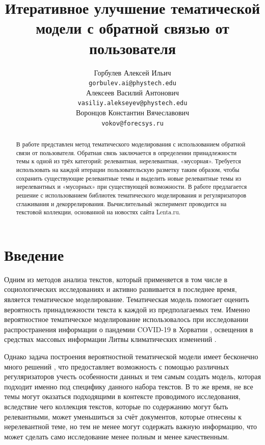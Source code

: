 \documentclass{article}
\title{Итеративное улучшение тематической модели с обратной связью от пользователя}
\author{ Горбулев Алексей Ильич \\
	\texttt{gorbulev.ai@phystech.edu} \\
	\And
	Алексеев Василий Антонович \\
	\texttt{vasiliy.alekseyev@phystech.edu} \\
	\And
    Воронцов Константин Вячеславович \\
    \texttt{vokov@forecsys.ru} \\
}
\date{}
\begin{document}
\maketitle



\begin{abstract}
	В работе представлен метод тематического моделирования с использованием обратной связи от пользователя. Обратная связь заключается в определении принадлежности темы к одной из трёх категорий: релевантная, нерелевантная, «мусорная». Требуется использовать на каждой итерации пользовательскую разметку таким образом, чтобы сохранить существующие релевантные темы и выделить новые релевантные темы из нерелевантных и «мусорных» при существующей возможности. В работе предлагается решение с использованием библиотек тематического моделирования и регуляризаторов сглаживания и декоррелирования. Вычислительный эксперимент проводится на текстовой коллекции, основанной на новостях сайта Lenta.ru.
\end{abstract}


\section{Введение}
Одним из методов анализа текстов, который применяется в том числе в социологических исследованиях и активно развивается в последнее время, является тематическое моделирование. Тематическая модель помогает оценить вероятность принадлежности текста к каждой из предполагаемых тем. Именно вероятностное тематическое моделирование использовалось при исследовании распространения информации о пандемии COVID-19 в Хорватии \citep{pandemic2021}, освещения в средствах массовых информации Литвы климатических изменений \citep{climate2021}.

Однако задача построения вероятностной тематической модели имеет бесконечно много решений \citep{bigartm}, что предоставляет возможность с помощью различных регуляризаторов учесть особенности данных и тем самым создать модель, которая подходит именно под специфику данного набора текстов. В то же время, не все темы могут оказаться подходящими в контексте проводимого исследования, вследствие чего коллекция текстов, которые по содержанию могут быть релевантными, может уменьшиться за счёт документов, которые отнесены к нерелевантной теме, но тем не менее могут содержать важную информацию, что может сделать само исследование менее полным и менее качественным.
\end{document}
